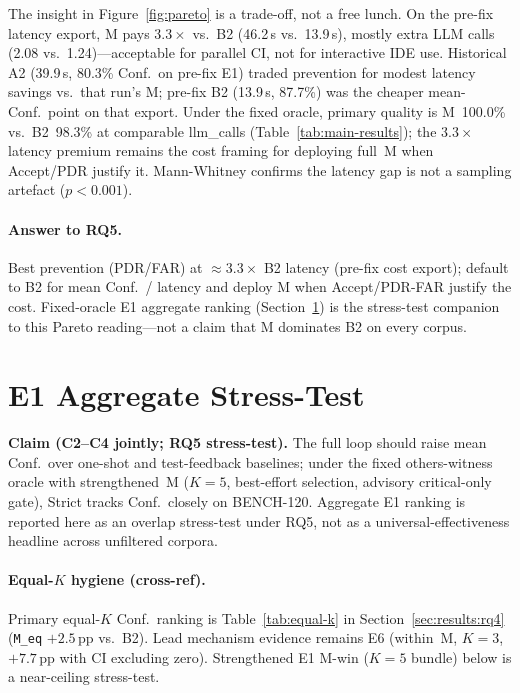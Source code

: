 The insight in Figure~\ref{fig:pareto} is a trade-off, not a free lunch.
On the pre-fix latency export, M pays $3.3\times$ vs.\ B2
(46.2\,s vs.\ 13.9\,s), mostly extra LLM calls (2.08 vs.\ 1.24)---acceptable
for parallel CI, not for interactive IDE use.
Historical A2 (39.9\,s, 80.3\% Conf.\ on pre-fix E1) traded prevention for
modest latency savings vs.\ that run's M; pre-fix B2 (13.9\,s, 87.7\%) was
the cheaper mean-Conf.\ point on that export.
Under the fixed oracle, primary quality is M~100.0\% vs.\ B2~98.3\% at
comparable llm\_calls (Table~\ref{tab:main-results}); the $3.3\times$ latency
premium remains the cost framing for deploying full~M when Accept/PDR justify
it.
Mann-Whitney confirms the latency gap is not a sampling artefact
($p{<}0.001$).

\paragraph{Answer to RQ5.}
Best prevention (PDR/FAR) at ${\approx}3.3\times$ B2 latency (pre-fix cost
export); default to B2 for mean Conf.\ / latency and deploy M when
Accept/PDR-FAR justify the cost.
Fixed-oracle E1 aggregate ranking (Section~\ref{sec:results:e1-detail}) is the
stress-test companion to this Pareto reading---not a claim that M dominates
B2 on every corpus.

\section{E1 Aggregate Stress-Test}
\label{sec:results:e1-detail}

\textbf{Claim (C2--C4 jointly; RQ5 stress-test).}
The full loop should raise mean Conf.\ over one-shot and
test-feedback baselines; under the fixed others-witness oracle with
strengthened~M ($K{=}5$, best-effort selection, advisory critical-only gate),
Strict tracks Conf.\ closely on BENCH-120.
Aggregate E1 ranking is reported here as an overlap stress-test under RQ5,
not as a universal-effectiveness headline across unfiltered corpora.

\paragraph{Equal-$K$ hygiene (cross-ref).}
Primary equal-$K$ Conf.\ ranking is Table~\ref{tab:equal-k} in
Section~\ref{sec:results:rq4} (\texttt{M\_eq} ${+}2.5$\,pp vs.\ B2).
Lead mechanism evidence remains E6 (within~M, $K{=}3$, ${+}7.7$\,pp with CI
excluding zero).
Strengthened E1 M-win ($K{=}5$ bundle) below is a near-ceiling stress-test.

